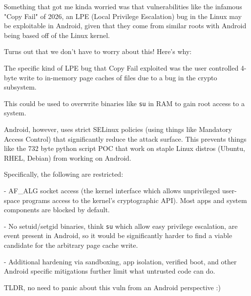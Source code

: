 

\newcommand{\DocTitle}{Copy Fail Fails on Android, why?}
\newcommand{\DocDescription}{a little pondering}
\newcommand{\DocTags}{writeup, android, linux}




Something that got me kinda worried was that vulnerabilities like the infamous "Copy Fail" of 2026, an LPE (Local Privilege Escalation) bug in the Linux may be exploitable in Android, given that they come from similar roots with Android being based off of the Linux kernel.

Turns out that we don't have to worry about this! Here's why:

The specific kind of LPE bug that Copy Fail exploited was the user controlled 4-byte write to in-memory page caches of files due to a bug in the crypto subsystem.

This could be used to overwrite binaries like \texttt{su} in RAM to gain root access to a system.

Android, however, uses strict SELinux policies (using things like Mandatory Access Control) that significantly reduce the attack surface. This prevents things like the \tildechar{}732 byte python script POC that work on staple Linux distros (Ubuntu, RHEL, Debian) from working on Android.

Specifically, the following are restricted:

- AF_ALG socket access (the kernel interface which allows unprivileged user-space programs access to the kernel's cryptographic API). Most apps and system components are blocked by default.

- No setuid/setgid binaries, think \texttt{su} which allow easy privilege escalation, are event present in Android, so it would be significantly harder to find a viable candidate for the arbitrary page cache write.

- Additional hardening via sandboxing, app isolation, verified boot, and other Android specific mitigations further limit what untrusted code can do.

TLDR, no need to panic about this vuln from an Android perspective :)


